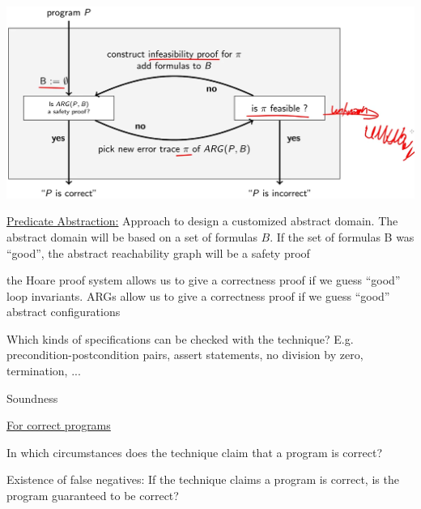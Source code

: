 \documentclass[a4paper]{article}
\begin{document}
\begin{minipage}[t]{0.16\linewidth}
\begin{betterlist}
{{\begin{betterlist}
					\includegraphics[width=\linewidth]{./figures/cegar_approach.png}
					\item \underline{Predicate Abstraction:} Approach to design a customized abstract domain. The abstract domain will be based on a set of formulas $B$. If the set of formulas B was \enquote{good}, the abstract reachability graph will be a safety proof
					\begin{betterlist}
						\item the Hoare proof system allows us to give a correctness proof if we guess \enquote{good} loop invariants. ARGs allow us to give a correctness proof if we guess “good” abstract configurations
					\end{betterlist}

				\end{betterlist}
			}}
		\item Which kinds of specifications can be checked with the technique? E.g. precondition-postcondition pairs, assert statements, no division by zero, termination, ...
		\item \alert{Soundness}
		\begin{betterlist}
			\item \underline{For correct programs}
			\begin{betterlist}
				\item In which circumstances does the technique claim that a program is correct?

				\item Existence of false negatives: If the technique claims a program is correct, is the program guaranteed to be correct?


\end{betterlist}
\end{betterlist}
\end{betterlist}
\end{minipage}
\end{document}
